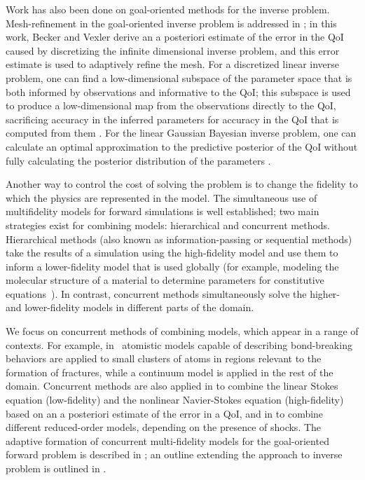Work has also been done on goal-oriented methods for the inverse problem. Mesh-refinement in the goal-oriented inverse problem is addressed in \cite{BecVex05}; in this work, Becker and Vexler derive an a posteriori estimate of the error in the QoI caused by discretizing the infinite dimensional inverse problem, and this error estimate is used to adaptively refine the mesh. For a discretized linear inverse problem, one can find a low-dimensional subspace of the parameter space that is both informed by observations and informative to the QoI; this subspace is used to produce a low-dimensional map from the observations directly to the QoI, sacrificing accuracy in the inferred parameters for accuracy in the QoI that is computed from them \cite{LiebWill13}. For the linear Gaussian Bayesian inverse problem, one can calculate an optimal approximation to the predictive posterior of the QoI without fully calculating the posterior distribution of the parameters \cite{Span16}. 

Another way to control the cost of solving the problem is to change the fidelity to which the physics are represented in the model. The simultaneous use of multifidelity models for forward simulations is well established; two main strategies exist for combining models: hierarchical and concurrent methods. Hierarchical methods (also known as information-passing or sequential methods) take the results of a simulation using the high-fidelity model and use them to inform a lower-fidelity model that is used globally (for example, modeling the molecular structure of a material to determine parameters for constitutive equations~\cite{Haoetal03}). In contrast, concurrent methods simultaneously solve the higher- and lower-fidelity models in different parts of the domain.

We focus on concurrent methods of combining models, which appear in a range of contexts. For example, in~\cite{Khareetal08} atomistic models capable of describing bond-breaking behaviors are applied to small clusters of atoms in regions relevant to the formation of fractures, while a continuum model is applied in the rest of the domain. Concurrent methods are also applied in \cite{vanOpstaletal15} to combine the linear Stokes equation (low-fidelity) and the nonlinear Navier-Stokes equation (high-fidelity) based on an a posteriori estimate of the error in a QoI, and in \cite{LucKinBer02} to combine different reduced-order models, depending on the presence of shocks. The adaptive formation of concurrent multi-fidelity models for the goal-oriented forward problem is described in \cite{OdenPrudetal06}; an outline extending the approach to inverse problem is outlined in \cite{OdenPrudetal10}.

